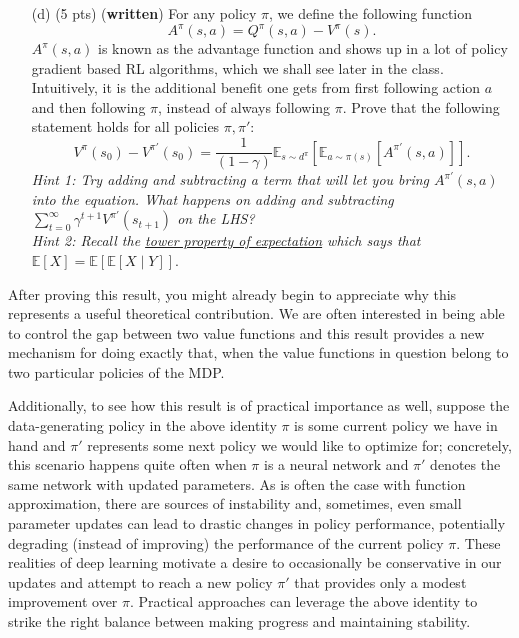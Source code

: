 \documentclass{article}
\begin{document}
 \begin{enumerate}
    \item [(d) (5 pts)] (\textbf{written}) For any policy $\pi$, we define the following function $$A^\pi(s,a) = Q^\pi(s,a) - V^\pi(s).$$ $A^\pi(s,a)$ is known as the advantage function and shows up in a lot of policy gradient based RL algorithms, which we shall see later in the class. Intuitively, it is the additional benefit one gets from first following action $a$ and then following $\pi$, instead of always following $\pi$. Prove that the following statement holds for all policies $\pi,\pi'$: $$V^\pi(s_0) - V^{\pi'}(s_0) = \frac{1}{(1-\gamma)} \mathbb{E}_{s \sim d^\pi}\left[\mathbb{E}_{a \sim \pi(s)}\left[A^{\pi'}(s,a)\right]\right].$$
    \emph{Hint 1: Try adding and subtracting a term that will let you bring $A^{\pi'}(s,a)$ into the equation. What happens on adding and subtracting $\sum\limits_{t=0}^\infty \gamma^{t+1} V^{\pi'}(s_{t+1})$ on the LHS?} \\
    \emph{Hint 2: Recall the \href{https://en.wikipedia.org/wiki/Law_of_total_expectation}{tower property of expectation} which says that $\mathbb{E}\left[X\right] = \mathbb{E}\left[\mathbb{E}\left[X \mid Y\right]\right]$}.
\end{enumerate}

After proving this result, you might already begin to appreciate why this represents a useful theoretical contribution. We are often interested in being able to control the gap between two value functions and this result provides a new mechanism for doing exactly that, when the value functions in question belong to two particular policies of the MDP. 

Additionally, to see how this result is of practical importance as well, suppose the data-generating policy in the above identity $\pi$ is some current policy we have in hand and $\pi'$ represents some next policy we would like to optimize for; concretely, this scenario happens quite often when $\pi$ is a neural network and $\pi'$ denotes the same network with updated parameters. As is often the case with function approximation, there are sources of instability and, sometimes, even small parameter updates can lead to drastic changes in policy performance, potentially degrading (instead of improving) the performance of the current policy $\pi$. These realities of deep learning motivate a desire to occasionally be conservative in our updates and attempt to reach a new policy $\pi'$ that provides only a modest improvement over $\pi$. Practical approaches can leverage the above identity to strike the right balance between making progress and maintaining stability. 
\end{document}
